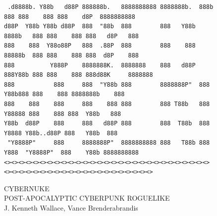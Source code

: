 \documentclass[10pt,conference,onecolumn,compsoc]{IEEEtran}
\begin{document}
\begin{figure}

\centering
\begin{footnotesize}
\begin{BVerbatim}
 .d8888b. Y88b   d88P 888888b.   8888888888 8888888b.  888b    888 888    888 888    d8P  8888888888 
d88P  Y88b Y88b d88P  888  "88b  888        888   Y88b 8888b   888 888    888 888   d8P   888        
888    888  Y88o88P   888  .88P  888        888    888 88888b  888 888    888 888  d8P    888        
888          Y888P    8888888K.  8888888    888   d88P 888Y88b 888 888    888 888d88K     8888888    
888           888     888  "Y88b 888        8888888P"  888 Y88b888 888    888 8888888b    888        
888    888    888     888    888 888        888 T88b   888  Y88888 888    888 888  Y88b   888        
Y88b  d88P    888     888   d88P 888        888  T88b  888   Y8888 Y88b..d88P 888   Y88b  888        
 "Y8888P"     888     8888888P"  8888888888 888   T88b 888    Y888  "Y8888P"  888    Y88b 8888888888 
<><><><><><><><><><><><><><><><><><><><><><><><><><><><><><><><><><><><><><><><><><><><><><><><><><>

\end{BVerbatim}
\end{footnotesize}

CYBERNUKE\\
{\small POST-APOCALYPTIC CYBERPUNK ROGUELIKE}\\
J. Kenneth Wallace, Vance Brenderabrandis\\
\end{figure}



\end{document}
